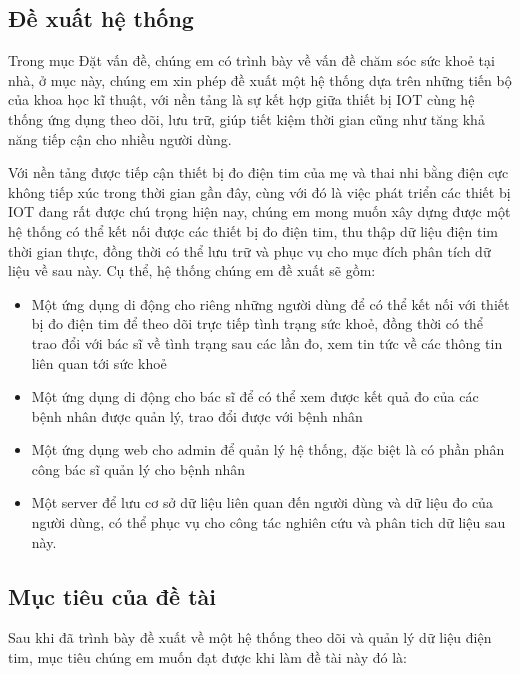 \subsection*{Đề xuất hệ thống}

Trong mục Đặt vấn đề, chúng em có trình bày về vấn đề chăm sóc sức khoẻ tại nhà, ở mục này, chúng em xin phép đề xuất một hệ thống
dựa trên những tiến bộ của khoa học kĩ thuật, với nền tảng là sự kết hợp giữa thiết bị IOT cùng hệ thống ứng dụng theo dõi, lưu trữ,
giúp tiết kiệm thời gian cũng như tăng khả năng tiếp cận cho nhiều người dùng. 

Với nền tảng được tiếp cận thiết bị đo điện tim của mẹ và thai nhi bằng điện cực không tiếp xúc trong thời gian gần đây, 
cùng với đó là việc phát triển các thiết bị IOT đang rất được chú trọng hiện nay, chúng em mong muốn xây dựng được một hệ thống
có thể kết nối được các thiết bị đo điện tim, thu thập dữ liệu điện tim thời gian thực, đồng thời có thể lưu trữ và phục vụ cho mục đích
phân tích dữ liệu về sau này. Cụ thể, hệ thống chúng em đề xuất sẽ gồm:

\begin{adjustwidth}{1.5em}{}
  \begin{itemize}
      \item Một ứng dụng di động cho riêng những người dùng để có thể kết nối với thiết bị đo điện tim để theo dõi trực tiếp tình trạng sức khoẻ, đồng
      thời có thể trao đổi với bác sĩ về tình trạng sau các lần đo, xem tin tức về các thông tin liên quan tới sức khoẻ
  
      \item Một ứng dụng di động cho bác sĩ để có thể xem được kết quả đo của các bệnh nhân được quản lý, trao đổi được với bệnh nhân
  
      \item Một ứng dụng web cho admin để quản lý hệ thống, đặc biệt là có phần phân công bác sĩ quản lý cho bệnh nhân
  
      \item Một server để lưu cơ sở dữ liệu liên quan đến người dùng và dữ liệu đo của người dùng, có thể phục vụ cho công tác nghiên cứu và
      phân tich dữ liệu sau này.
  \end{itemize}
  \end{adjustwidth}


\subsection*{Mục tiêu của đề tài}
Sau khi đã trình bày đề xuất về một hệ thống theo dõi và quản lý dữ liệu điện tim, mục tiêu chúng em muốn đạt được khi
làm đề tài này đó là:

